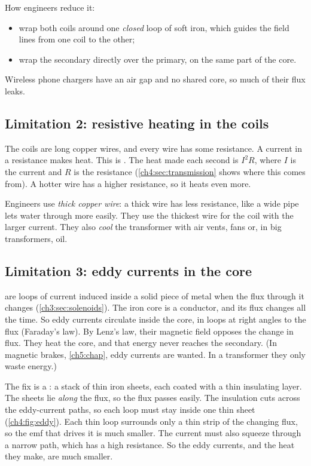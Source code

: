 How engineers reduce it:
\begin{itemize}
  \item wrap both coils around one \emph{closed} loop of soft iron, which guides the field
        lines from one coil to the other;
  \item wrap the secondary directly over the primary, on the same part of the core.
\end{itemize}
Wireless phone chargers have an air gap and no shared core, so much of their flux leaks.

\subsection{Limitation 2: resistive heating in the coils}

The coils are long copper wires, and every wire has some resistance. A current in a
resistance makes heat. This is . The heat made each second is
$I^2R$, where $I$ is the current and $R$ is the resistance (\cref{ch4:sec:transmission}
shows where this comes from). A hotter wire has a higher resistance, so it heats even
more.

Engineers use \emph{thick copper wire}: a thick wire has less resistance, like a wide pipe
lets water through more easily. They use the thickest wire for the coil with the larger
current. They also \emph{cool} the transformer with air vents, fans or, in big
transformers, oil.

\subsection{Limitation 3: eddy currents in the core}

 are loops of current induced inside a solid piece of metal when the
flux through it changes (\cref{ch3:sec:solenoids}). The iron core is a conductor, and its
flux changes all the time. So eddy currents circulate inside the core, in loops at right
angles to the flux (Faraday's law). By Lenz's law, their magnetic field opposes the change
in flux. They heat the core, and that energy never reaches the secondary. (In magnetic brakes, \cref{ch5:chap}, eddy currents are wanted. In a
transformer they only waste energy.)

The fix is a : a stack of thin iron sheets, each coated with a thin
insulating layer. The sheets lie \emph{along} the flux, so the flux passes easily. The
insulation cuts across the eddy-current paths, so each loop must stay inside one thin
sheet (\cref{ch4:fig:eddy}). Each thin loop surrounds only a thin strip of the changing
flux, so the emf that drives it is much smaller. The current must also squeeze through a
narrow path, which has a high resistance. So the eddy currents, and the heat they make,
are much smaller.

